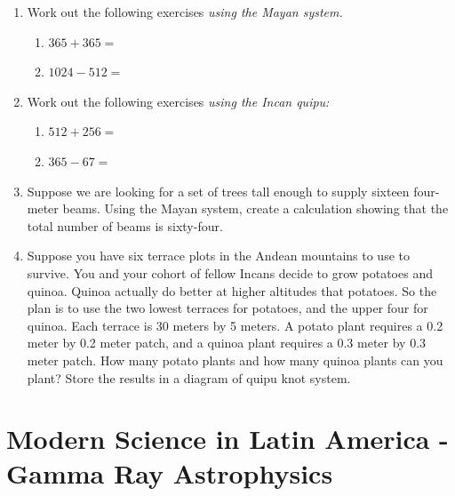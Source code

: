 \documentclass[10pt]{article}
\begin{document}
\begin{enumerate}
\item Work out the following exercises \textit{using the Mayan system.}
\begin{enumerate}
\item $365 + 365 = $ \vspace{1cm}
\item $1024 - 512 = $ \vspace{1cm}
\end{enumerate}
\item Work out the following exercises \textit{using the Incan quipu:}
\begin{enumerate}
\item $512 + 256 = $ \vspace{1cm}
\item $365 - 67 = $ \vspace{1cm}
\end{enumerate}
\item Suppose we are looking for a set of trees tall enough to supply sixteen four-meter beams.  Using the Mayan system, create a calculation showing that the total number of beams is sixty-four. \\ \vspace{2cm}
\item Suppose you have six terrace plots in the Andean mountains to use to survive.  You and your cohort of fellow Incans decide to grow potatoes and quinoa. Quinoa actually do better at higher altitudes that potatoes.  So the plan is to use the two lowest terraces for potatoes, and the upper four for quinoa.  Each terrace is 30 meters by 5 meters.  A potato plant requires a 0.2 meter by 0.2 meter patch, and a quinoa plant requires a 0.3 meter by 0.3 meter patch.  How many potato plants and how many quinoa plants can you plant? Store the results in a diagram of quipu knot system. \\ \vspace{2.5cm}
\end{enumerate}

\section{Modern Science in Latin America - Gamma Ray Astrophysics}
\end{document}
